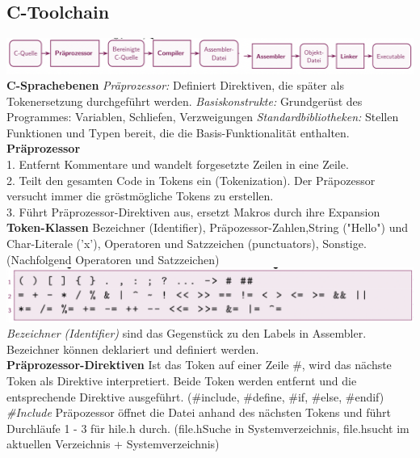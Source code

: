 \documentclass[7pt,landscape,a4paper]{scrartcl}
\begin{document}
\begin{multicols*}{4}
\vspace{-0.75em}
\subsection{C-Toolchain}
\includegraphics[width=\linewidth]{ctoolchain}
\textbf{C-Sprachebenen}
\textit{Präprozessor:} Definiert Direktiven, die später als Tokenersetzung durchgeführt werden.
\textit{Basiskonstrukte:} Grundgerüst des Programmes: Variablen, Schliefen, Verzweigungen \textit{Standardbibliotheken:} Stellen Funktionen und Typen bereit, die die Basis-Funktionalität enthalten.\\
\textbf{Präprozessor}\\
1. Entfernt Kommentare und wandelt forgesetzte Zeilen in eine Zeile.\\
2. Teilt den gesamten Code in Tokens ein (Tokenization). Der Präpozessor versucht immer die gröstmögliche Tokens zu erstellen.\\
3. Führt Präprozessor-Direktiven aus, ersetzt Makros durch ihre Expansion
\\
\textbf{Token-Klassen}
Bezeichner (Identifier), Präpozessor-Zahlen,String ("Hello") und Char-Literale ('x'), Operatoren und Satzzeichen (punctuators), Sonstige. (Nachfolgend Operatoren und Satzzeichen)\\
\includegraphics[width=\linewidth]{operatorenundsatzzeichen}\\
\textit{Bezeichner (Identifier)} sind das Gegenstück zu den Labels in Assembler. Bezeichner können deklariert und definiert werden.\\
\textbf{Präprozessor-Direktiven}
Ist das Token auf einer Zeile \#, wird das nächste Token als Direktive interpretiert. Beide Token werden entfernt und die entsprechende Direktive ausgeführt. (\#include, \#define, \#if, \#else, \#endif)\\
\textit{\#Include} Präpozessor öffnet die Datei anhand des nächsten Tokens und führt Durchläufe 1 - 3 für hile.h durch. (\flq file.h\frq  Suche in Systemverzeichnis, \grqq file.h\grqq sucht im aktuellen Verzeichnis + Systemverzeichnis)\\

\end{multicols*}
\end{document}
